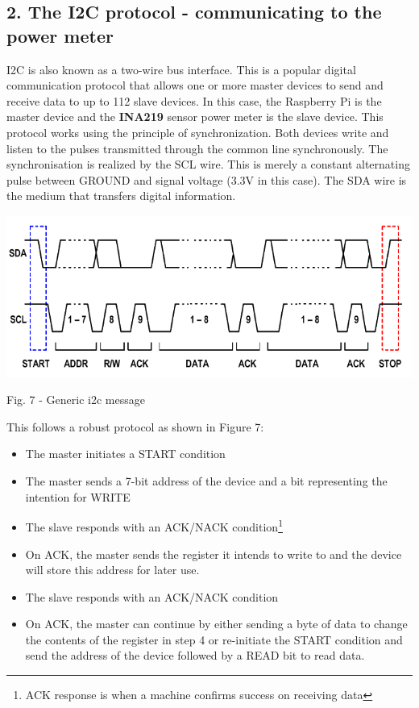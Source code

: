 \documentclass{IEEEtran}
\begin{document}
\subsection*{{2. The I2C protocol - communicating to the power meter}}
I2C is also known as a two-wire bus interface. This is a popular digital communication protocol that allows one or more master devices to send and receive data to up to 112 slave devices. In this case, the Raspberry Pi is the master device and the \textbf{INA219} sensor power meter is the slave device. This protocol works using the principle of synchronization. Both devices write and listen to the pulses transmitted through the common line synchronously. The synchronisation is realized by the SCL wire. This is merely a constant alternating pulse between GROUND and signal voltage (3.3V in this case). The SDA wire is the medium that transfers digital information. 
\begin{center}\includegraphics[scale=.35]{i2c.png}\end{center}
\begin{it}\begin{center}Fig. 7 - Generic i2c message \end{center}\end{it}
This follows a robust protocol as shown in Figure 7:
\begin{itemize}
    \item The master initiates a START condition
    \item The master sends a 7-bit address of the device and a bit representing the intention for WRITE
    \item The slave responds with an ACK/NACK condition\footnote{ACK response is when a machine confirms success on receiving data}
    \item On ACK, the master sends the register it intends to write to and the device will store this address for later use.
    \item The slave responds with an ACK/NACK condition
    \item On ACK, the master can continue by either sending a byte of data to change the contents of the register in step 4 or re-initiate the START condition and send the address of the device followed by a READ bit to read data.
\end{itemize}
\end{document}
